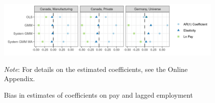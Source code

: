 \begin{figure} [H]
\centering
\includegraphics[width=\linewidth]{r-graphs/fig_estimates3.png}
\caption{Bias in estimates of coefficients on  pay and lagged employment\label{fig:estimates3}} 
\begin{minipage}{0.70\linewidth}
{\footnotesize \textit{Note}: For details on the estimated coefficients, see the Online Appendix. \par}
\end{minipage}
\end{figure}
